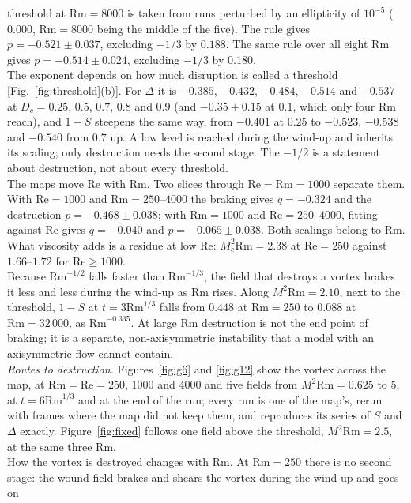 \documentclass[aps,prl,twocolumn,reprint,amsmath,amssymb,superscriptaddress,floatfix]{revtex4-2}
\newcommand{\Rm}{\mathrm{Rm}}
\newcommand{\Rey}{\mathrm{Re}}
\begin{document}
threshold at $\Rm=8000$ is taken from runs perturbed by an ellipticity of $10^{-5}$
($0.000$, $\Rm=8000$ being the middle of the five). The rule gives $p=-0.521\pm0.037$, excluding $-1/3$ by $0.188$.
The same rule over all eight $\Rm$ gives $p=-0.514\pm0.024$, excluding $-1/3$ by
$0.180$.\\
\indent The exponent depends on how much disruption is called a threshold
[Fig.~\ref{fig:threshold}(b)]. For $\Delta$ it is $-0.385$, $-0.432$, $-0.484$,
$-0.514$ and $-0.537$ at $D_c=0.25$, $0.5$, $0.7$, $0.8$ and $0.9$ (and
$-0.35\pm0.15$ at $0.1$, which only four $\Rm$ reach), and $1-S$ steepens the
same way, from $-0.401$ at $0.25$ to $-0.523$, $-0.538$ and $-0.540$ from $0.7$
up. A low level is reached during the wind-up and inherits its scaling; only
destruction needs the second stage. The $-1/2$ is a statement about destruction,
not about every threshold.\\
\indent The maps move $\Rey$ with $\Rm$. Two slices through
$\Rey=\Rm=1000$ separate them. With $\Rey=1000$ and $\Rm=250$--$4000$ the braking
gives $q=-0.324$ and the destruction $p=-0.468\pm0.038$; with $\Rm=1000$ and
$\Rey=250$--$4000$, fitting against $\Rey$ gives $q=-0.040$ and $p=-0.065\pm0.038$. Both scalings belong to
$\Rm$. What viscosity adds is a residue at low $\Rey$: $M_c^2\Rm=2.38$ at
$\Rey=250$ against $1.66$--$1.72$ for $\Rey\ge1000$.\\
\indent Because $\Rm^{-1/2}$ falls faster than $\Rm^{-1/3}$, the field that destroys a
vortex brakes it less and less during the wind-up as $\Rm$ rises. Along
$M^2\Rm=2.10$, next to the threshold, $1-S$ at $t=3\Rm^{1/3}$ falls from $0.448$ at
$\Rm=250$ to $0.088$ at $\Rm=32\,000$, as $\Rm^{-0.335}$. At large $\Rm$ destruction is
not the end point of braking; it is a separate, non-axisymmetric instability that a
model with an axisymmetric flow cannot contain.\\
\indent \textit{Routes to destruction.} Figures~\ref{fig:g6} and \ref{fig:g12} show the
vortex across the map, at $\Rm=\Rey=250$, $1000$ and $4000$ and five fields from
$M^2\Rm=0.625$ to $5$, at $t=6\Rm^{1/3}$ and at the end of the run; every run is
one of the map's, rerun with frames where the map did not keep them, and
reproduces its series of $S$ and $\Delta$ exactly. Figure~\ref{fig:fixed} follows
one field above the threshold, $M^2\Rm=2.5$, at the same three $\Rm$.\\
\indent How the vortex is destroyed changes with $\Rm$. At $\Rm=250$ there is no second
stage: the wound field brakes and shears the vortex during the wind-up and goes on
\end{document}
